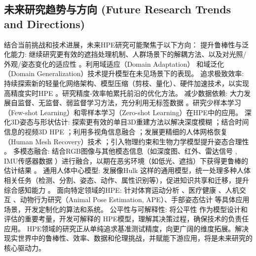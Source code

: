 \documentclass[12pt,a4paper]{article}
\begin{document}
\subsection{未来研究趋势与方向 (Future Research Trends and Directions)}
结合当前挑战和技术进展，未来HPE研究可能聚焦于以下方向：
提升鲁棒性与泛化能力: 继续研究更有效的遮挡处理机制、人群场景下的解耦方法、以及对光照/外观/姿态变化的适应性 \cite{Wang2023TransformerSurvey}。利用域适应（Domain Adaptation）\cite{Park2024DomainAdaptationHPE} 和域泛化（Domain Generalization）技术提升模型在未见场景下的表现。 %
追求极致效率: 持续探索新的轻量化网络架构、模型压缩（剪枝、量化）、硬件加速技术，以实现高精度实时HPE \cite{Sun2023SHaRPose}。研究精度-效率帕累托前沿的优化方法。
减少数据依赖: 大力发展自监督、无监督、弱监督学习方法，充分利用无标签数据 \cite{Zhang2018PoseResNet}。研究少样本学习（Few-shot Learning）和零样本学习（Zero-shot Learning）在HPE中的应用。
深化3D姿态与形状估计: 探索更有效的单目3D重建方法以解决深度模糊 \cite{Martinez2017Simple3D}；结合时间信息的视频3D HPE \cite{Gong2022PoseTriplet}；利用多视角信息融合 \cite{Kocabas2019EpipolarPose}；发展更精细的人体网格恢复（Human Mesh Recovery）技术 \cite{Kanazawa2018HMR}；引入物理约束和生物力学模型提升姿态合理性 \cite{Martinez2017Simple3D}。 %
多模态融合: 结合RGB图像与其他模态信息（如深度图、红外、雷达信号 \cite{Toshev2014DeepPose}, IMU传感器数据 \cite{vonMarcard2017IMUFusion}）进行融合，以期在恶劣环境（如低光、遮挡）下获得更鲁棒的估计结果 \cite{Wang2023TransformerSurvey}。
通用人体中心模型: 发展像Hulk \cite{Wang2023Hulk} 这样的通用模型，统一处理多种人体相关任务（检测、分割、姿态、动作、属性识别等），促进知识共享和迁移，提升综合感知能力 \cite{Wang2023Hulk}。
面向特定领域的HPE: 针对体育运动分析 \cite{Thomas2017KeepItSMPL}、医疗健康 \cite{Rather2024HPEReview3D}、人机交互 \cite{Cao2019OpenPose}、动物行为研究（Animal Pose Estimation, APE）\cite{Mathis2018DeepLabCut}、手部姿态估计 \cite{Simon2017HandKeypoint} 等具体应用场景，开发定制化的算法和系统。
公平性与可解释性: 将公平性 \cite{Buolamwini2018GenderShades} 作为模型设计和评估的重要考量，开发可解释的 \cite{Yang2020TransPose} HPE模型，理解其决策过程，确保技术的负责任应用。
HPE领域的研究正从单纯追求基准测试精度，向更广阔的维度拓展。解决现实世界中的鲁棒性、效率、数据和伦理挑战，并赋能下游应用，将是未来研究的核心驱动力。
\end{document}
